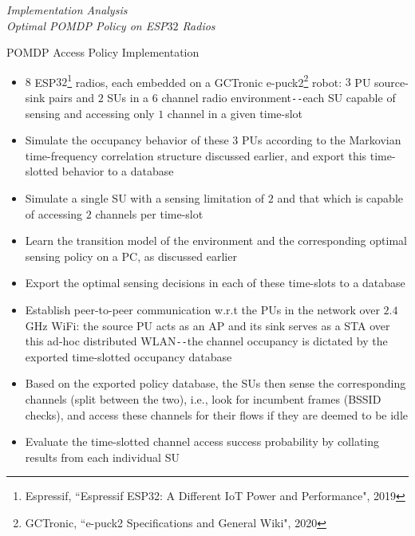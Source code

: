 \documentclass{beamer}
\begin{document}
\begin{frame}{}
  \centering \Huge
  \emph{Implementation Analysis\\
        \LARGE{Optimal POMDP Policy on ESP$32$ Radios}}
\end{frame}
\begin{frame}{POMDP Access Policy Implementation}
    \scriptsize{\begin{itemize}
        \item $8$ ESP$32$\footnote{\tiny{Espressif, ``Espressif ESP32: A Different IoT Power and Performance", 2019}} radios, each embedded on a GCTronic e-puck2\footnote{\tiny{GCTronic, ``e-puck2 Specifications and General Wiki", 2020}} robot: $3$ PU source-sink pairs and $2$ SUs in a $6$ channel radio environment\texttt{-{}-}each SU capable of sensing and accessing only $1$ channel in a given time-slot
        \item Simulate the occupancy behavior of these $3$ PUs according to the Markovian time-frequency correlation structure discussed earlier, and export this time-slotted behavior to a database
        \item Simulate a single SU with a sensing limitation of $2$ and that which is capable of accessing $2$ channels per time-slot
        \item Learn the transition model of the environment and the corresponding optimal sensing policy on a PC, as discussed earlier
        \item Export the optimal sensing decisions in each of these time-slots to a database
        \item Establish peer-to-peer communication w.r.t the PUs in the network over $2.4$GHz WiFi: the source PU acts as an AP and its sink serves as a STA over this ad-hoc distributed WLAN\texttt{-{}-}the channel occupancy is dictated by the exported time-slotted occupancy database
        \item Based on the exported policy database, the SUs then sense the corresponding channels (split between the two), i.e., look for incumbent frames (BSSID checks), and access these channels for their flows if they are deemed to be idle
        \item Evaluate the time-slotted channel access success probability by collating results from each individual SU
    \end{itemize}}
\end{frame}
\end{document}
